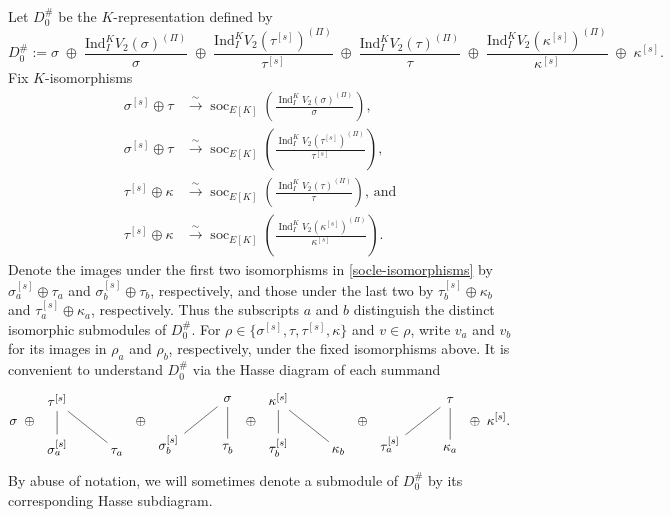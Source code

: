 \documentclass[a4paper,10pt,twoside]{amsart}
\DeclareMathOperator{\Ind}{Ind}
\DeclareMathOperator{\soc}{soc}
\theoremstyle{definition}
\numberwithin{equation}{section}
\begin{document}
Let $D_0^\#$ be the $K$-representation defined by
\[
D_0^\# :=
\sigma \;\oplus\;
\frac{\mathrm{Ind}_I^K V_2(\sigma)^{(\Pi)}}{\sigma}
\;\oplus\;
\frac{\mathrm{Ind}_I^K V_2(\tau^{[s]})^{(\Pi)}}{\tau^{[s]}}
\;\oplus\;
\frac{\mathrm{Ind}_I^K V_2(\tau)^{(\Pi)}}{\tau}
\;\oplus\;
\frac{\mathrm{Ind}_I^K V_2(\kappa^{[s]})^{(\Pi)}}{\kappa^{[s]}}
\;\oplus\;
\kappa^{[s]}.
\]
Fix \(K\)-isomorphisms
\begin{equation}\label{socle-isomorphisms}
\begin{aligned}
\sigma^{[s]}\oplus\tau
&\xrightarrow{\sim}
\soc_{E[K]}\!\left(\frac{\Ind_I^K V_2(\sigma)^{(\Pi)}}{\sigma}\right),\\
\sigma^{[s]}\oplus\tau
&\xrightarrow{\sim}
\soc_{E[K]}\!\left(\frac{\Ind_I^K V_2(\tau^{[s]})^{(\Pi)}}{\tau^{[s]}}\right),\\
\tau^{[s]}\oplus\kappa
&\xrightarrow{\sim}
\soc_{E[K]}\!\left(\frac{\Ind_I^K V_2(\tau)^{(\Pi)}}{\tau}\right),\,\text{and}\\
\tau^{[s]}\oplus\kappa
&\xrightarrow{\sim}
\soc_{E[K]}\!\left(\frac{\Ind_I^K V_2(\kappa^{[s]})^{(\Pi)}}{\kappa^{[s]}}\right).
\end{aligned}
\end{equation}
Denote the images under the first two isomorphisms in
\eqref{socle-isomorphisms} by
\(\sigma^{[s]}_a\oplus\tau_a\) and
\(\sigma^{[s]}_b\oplus\tau_b\), respectively, and those under
the last two by \(\tau^{[s]}_b\oplus\kappa_b\) and
\(\tau^{[s]}_a\oplus\kappa_a\), respectively. Thus the subscripts \(a\) and \(b\) distinguish the distinct isomorphic submodules of \(D_0^\#\). For \(\rho\in\{\sigma^{[s]},\tau,\tau^{[s]},\kappa\}\)
and \(v\in\rho\), write \(v_a\) and \(v_b\) for its images in \(\rho_a\) and \(\rho_b\), respectively, under the fixed isomorphisms above. It is convenient to understand $D_0^\#$ via the Hasse diagram of each summand
\[
\sigma \;\oplus\;
\begin{tikzcd}
	{\tau^{[s]}} & \\
	{\sigma^{[s]}_a} & {\tau_a}
	\arrow[no head, from=1-1, to=2-1]
	\arrow[no head, from=1-1, to=2-2]
\end{tikzcd}
\;\oplus\;
\begin{tikzcd}
	& \sigma \\
	{\sigma^{[s]}_b} & {\tau^{}_{b}}
	\arrow[no head, from=1-2, to=2-1]
	\arrow[no head, from=1-2, to=2-2]
\end{tikzcd}
\;\oplus\;
\begin{tikzcd}
	{\kappa^{[s]}} & \\
	{\tau^{[s]}_b} & {\kappa_b}
	\arrow[no head, from=1-1, to=2-1]
	\arrow[no head, from=1-1, to=2-2]
\end{tikzcd}
\;\oplus\;
\begin{tikzcd}
	& \tau \\
	{\tau^{[s]}_a} & {\kappa_a}
	\arrow[no head, from=1-2, to=2-1]
	\arrow[no head, from=1-2, to=2-2]
\end{tikzcd}
\;\oplus\;
\kappa^{[s]}.
\]
By abuse of notation, we will sometimes denote a submodule of
\(D_0^\#\) by its corresponding Hasse subdiagram.
\end{document}
